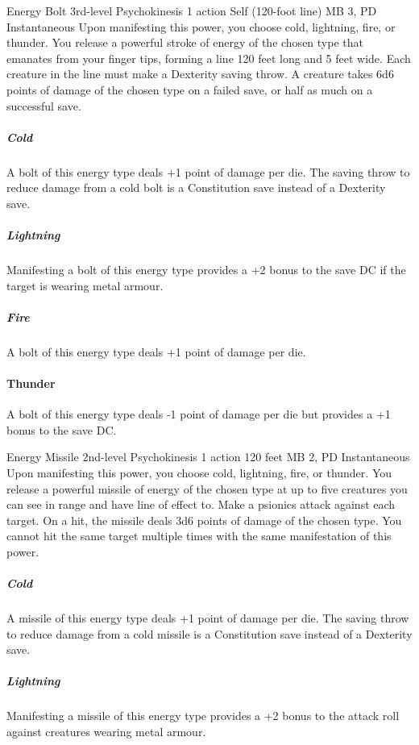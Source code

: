 \DndPowerHeader%
  {Energy Bolt}
  {3rd-level Psychokinesis}
  {1 action}
  {Self (120-foot line)}
  {MB 3, PD \lvlthree}
  {Instantaneous}
  Upon manifesting this power, you choose cold, lightning,
  fire, or thunder.
  You release a powerful stroke of energy of the chosen type
  that emanates from your finger tips,
  forming a line 120 feet long and 5 feet wide.
  Each creature in the line must make a Dexterity saving throw.
  A creature takes 6d6 points of damage of the chosen type
  on a failed save,
  or half as much on a successful save.
  
  \subparagraph{Cold}
  A bolt of this energy type deals +1 point of damage per die.
  The saving throw to reduce damage from a cold bolt
  is a Constitution save instead of a Dexterity save.
  
  \subparagraph{Lightning}
  Manifesting a bolt of this energy type provides
  a +2 bonus to the save DC if the target is wearing metal armour.
  
  \subparagraph{Fire}
  A bolt of this energy type deals +1 point of damage per die.
  
  \paragraph{Thunder}
  A bolt of this energy type deals -1 point of damage per die
  but provides a +1 bonus to the save DC.

\DndPowerHeader%
  {Energy Missile}
  {2nd-level Psychokinesis}
  {1 action}
  {120 feet}
  {MB 2, PD \lvltwo}
  {Instantaneous}
  Upon manifesting this power,
  you choose cold,
  lightning,
  fire,
  or thunder.
  You release a powerful missile of energy
  of the chosen type at up to five creatures you can see in range
  and have line of effect to.
  Make a psionics attack against each target.
  On a hit, the missile deals 3d6 points of damage of the chosen type.
  You cannot hit the same target multiple times
  with the same manifestation of this power.

  \subparagraph{Cold}
  A missile of this energy type deals +1 point of damage per die.
  The saving throw to reduce damage from a cold missile
  is a Constitution save instead of a Dexterity save.
  
  \subparagraph{Lightning}
  Manifesting a missile of this energy type provides
  a +2 bonus to the attack roll against creatures wearing metal armour.
  
